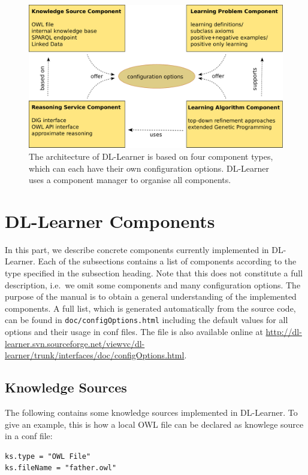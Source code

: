 \documentclass[a4paper,12pt]{scrartcl}
\begin{document}
\begin{figure}
 \includegraphics[width=\textwidth]{components_print}
 \caption{The architecture of DL-Learner is based on four component types, which can each have their own configuration options. DL-Learner uses a component manager to organise all components.}
 \label{fig:components}
\end{figure}

\section{DL-Learner Components}
\label{sec:components}

In this part, we describe concrete components currently implemented in DL-Learner. Each of the subsections contains a list of components according to the type specified in the subsection heading. Note that this does not constitute a full description, i.e.~we omit some components and many configuration options. The purpose of the manual is to obtain a general understanding of the implemented components. A full list, which is generated automatically from the source code, can be found in \verb|doc/configOptions.html| including the default values for all options and their usage in conf files. The file is also available online at \url{http://dl-learner.svn.sourceforge.net/viewvc/dl-learner/trunk/interfaces/doc/configOptions.html}.

\subsection{Knowledge Sources}

The following contains some knowledge sources implemented in DL-Learner. To give an example, this is how a local OWL file can be declared as knowlege source in a conf file:
\begin{verbatim}
ks.type = "OWL File"
ks.fileName = "father.owl"
\end{verbatim}
\end{document}
